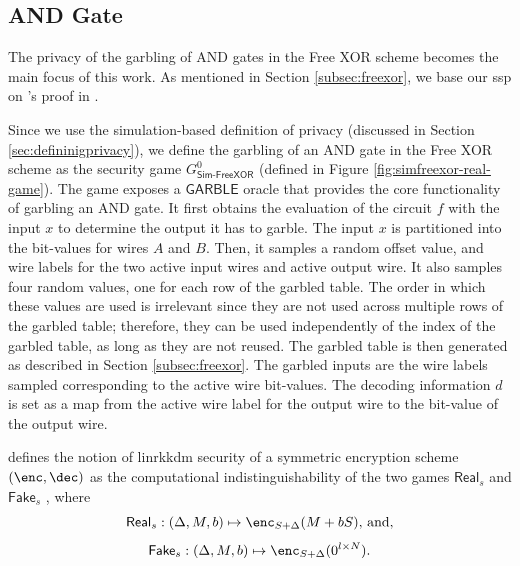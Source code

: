 \subsection{AND Gate}
\label{subsec:andgate}

The privacy of the garbling of AND gates in the Free XOR scheme becomes the main focus of this work. As mentioned in Section \ref{subsec:freexor}, we base our \acrlong{ssp} on \citeauthor{JC:Applebaum16}'s proof in \cite{JC:Applebaum16}.



Since we use the simulation-based definition of privacy (discussed in Section \ref{sec:defininigprivacy}), we define the garbling of an AND gate in the Free XOR scheme as the security game $G^0_\mathsf{Sim\text{-}FreeXOR}$ (defined in Figure \ref{fig:simfreexor-real-game}). The game exposes a $\mathsf{GARBLE}$ oracle that provides the core functionality of garbling an AND gate. It first obtains the evaluation of the circuit $f$ with the input $x$ to determine the output it has to garble. The input $x$ is partitioned into the bit-values for wires $A$ and $B$. Then, it samples a random offset value, and wire labels for the two active input wires and active output wire. It also samples four random values, one for each row of the garbled table. The order in which these values are used is irrelevant since they are not used across multiple rows of the garbled table; therefore, they can be used independently of the index of the garbled table, as long as they are not reused.
The garbled table is then generated as described in Section \ref{subsec:freexor}. The garbled inputs are the wire labels sampled corresponding to the active wire bit-values. The decoding information $d$ is set as a map from the active wire label for the output wire to the bit-value of the output wire.



\citeauthor{JC:Applebaum16} defines the notion of \acrshort{linrkkdm} security of a symmetric encryption scheme $(\enc,\dec)$ as the computational indistinguishability of the two games $\mathsf{Real}_s$ and $\mathsf{Fake}_s$ \cite[Section 3.2]{JC:Applebaum16}, where 
\[\mathsf{Real}_s: (\Delta, M, b) \mapsto \enc_{S+\Delta}(M+bS) \text{, and,}\]
\[\mathsf{Fake}_s: (\Delta, M, b) \mapsto \enc_{S+\Delta}(0^{l\times N}) \text{.}\]

